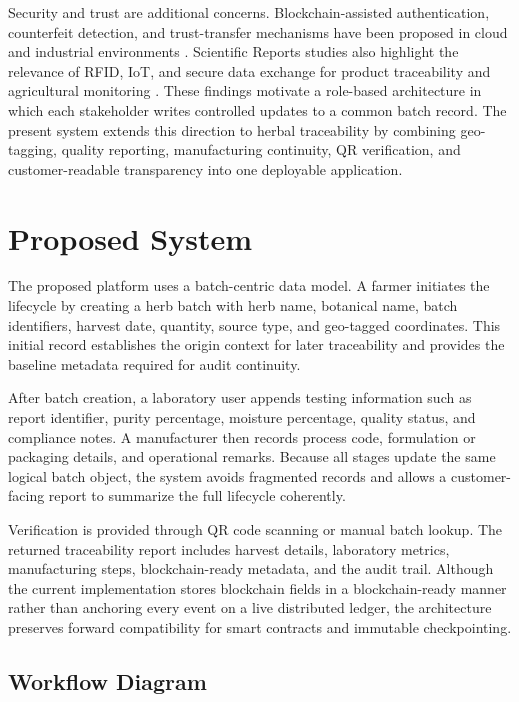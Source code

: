 \documentclass[conference]{IEEEtran}
\begin{document}
Security and trust are additional concerns. Blockchain-assisted authentication, counterfeit detection, and trust-transfer mechanisms have been proposed in cloud and industrial environments \cite{mani2022,shu2024,cao2024}. Scientific Reports studies also highlight the relevance of RFID, IoT, and secure data exchange for product traceability and agricultural monitoring \cite{li2024,pascoal2024,thiruvenkatasamy2025}. These findings motivate a role-based architecture in which each stakeholder writes controlled updates to a common batch record. The present system extends this direction to herbal traceability by combining geo-tagging, quality reporting, manufacturing continuity, QR verification, and customer-readable transparency into one deployable application.

\section{Proposed System}

The proposed platform uses a batch-centric data model. A farmer initiates the lifecycle by creating a herb batch with herb name, botanical name, batch identifiers, harvest date, quantity, source type, and geo-tagged coordinates. This initial record establishes the origin context for later traceability and provides the baseline metadata required for audit continuity.

After batch creation, a laboratory user appends testing information such as report identifier, purity percentage, moisture percentage, quality status, and compliance notes. A manufacturer then records process code, formulation or packaging details, and operational remarks. Because all stages update the same logical batch object, the system avoids fragmented records and allows a customer-facing report to summarize the full lifecycle coherently.

Verification is provided through QR code scanning or manual batch lookup. The returned traceability report includes harvest details, laboratory metrics, manufacturing steps, blockchain-ready metadata, and the audit trail. Although the current implementation stores blockchain fields in a blockchain-ready manner rather than anchoring every event on a live distributed ledger, the architecture preserves forward compatibility for smart contracts and immutable checkpointing.

\subsection{Workflow Diagram}
\end{document}
